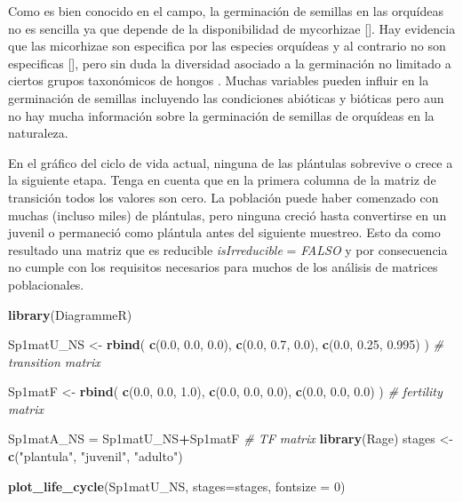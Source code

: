 \documentclass[
]{book}
\newenvironment{Shaded}{\begin{snugshade}}{\end{snugshade}}
\newcommand{\AttributeTok}[1]{\textcolor[rgb]{0.13,0.29,0.53}{#1}}
\newcommand{\CommentTok}[1]{\textcolor[rgb]{0.56,0.35,0.01}{\textit{#1}}}
\newcommand{\DecValTok}[1]{\textcolor[rgb]{0.00,0.00,0.81}{#1}}
\newcommand{\FloatTok}[1]{\textcolor[rgb]{0.00,0.00,0.81}{#1}}
\newcommand{\FunctionTok}[1]{\textcolor[rgb]{0.13,0.29,0.53}{\textbf{#1}}}
\newcommand{\NormalTok}[1]{#1}
\newcommand{\OtherTok}[1]{\textcolor[rgb]{0.56,0.35,0.01}{#1}}
\newcommand{\SpecialCharTok}[1]{\textcolor[rgb]{0.81,0.36,0.00}{\textbf{#1}}}
\newcommand{\StringTok}[1]{\textcolor[rgb]{0.31,0.60,0.02}{#1}}
\theoremstyle{definition}
\theoremstyle{definition}
\theoremstyle{definition}
\theoremstyle{definition}
\theoremstyle{remark}
\begin{document}
Como es bien conocido en el campo, la germinación de semillas en las orquídeas no es sencilla ya que depende de la disponibilidad de mycorhizae {[}{]}. Hay evidencia que las micorhizae son especifica por las especies orquídeas y al contrario no son especificas {[}{]}, pero sin duda la diversidad asociado a la germinación no limitado a ciertos grupos taxonómicos de hongos \citep{rasmussen2015germination}. Muchas variables pueden influir en la germinación de semillas incluyendo las condiciones abióticas y bióticas \citep{callaway2002epiphyte, rasmussen2015germination, gonzalez2024host} pero aun no hay mucha información sobre la germinación de semillas de orquídeas en la naturaleza.

En el gráfico del ciclo de vida actual, ninguna de las plántulas sobrevive o crece a la siguiente etapa. Tenga en cuenta que en la primera columna de la matriz de transición todos los valores son cero. La población puede haber comenzado con muchas (incluso miles) de plántulas, pero ninguna creció hasta convertirse en un juvenil o permaneció como plántula antes del siguiente muestreo. Esto da como resultado una matriz que es reducible \emph{isIrreducible} = \emph{FALSO} y por consecuencia no cumple con los requisitos necesarios para muchos de los análisis de matrices poblacionales.

\begin{Shaded}
\begin{Highlighting}[]
\FunctionTok{library}\NormalTok{(DiagrammeR)}

\NormalTok{Sp1matU\_NS }\OtherTok{\textless{}{-}} \FunctionTok{rbind}\NormalTok{(}
  \FunctionTok{c}\NormalTok{(}\FloatTok{0.0}\NormalTok{, }\FloatTok{0.0}\NormalTok{, }\FloatTok{0.0}\NormalTok{),}
  \FunctionTok{c}\NormalTok{(}\FloatTok{0.0}\NormalTok{, }\FloatTok{0.7}\NormalTok{, }\FloatTok{0.0}\NormalTok{),}
  \FunctionTok{c}\NormalTok{(}\FloatTok{0.0}\NormalTok{, }\FloatTok{0.25}\NormalTok{, }\FloatTok{0.995}\NormalTok{)}
\NormalTok{) }\CommentTok{\# transition matrix}

\NormalTok{Sp1matF }\OtherTok{\textless{}{-}} \FunctionTok{rbind}\NormalTok{(}
  \FunctionTok{c}\NormalTok{(}\FloatTok{0.0}\NormalTok{, }\FloatTok{0.0}\NormalTok{, }\FloatTok{1.0}\NormalTok{),}
  \FunctionTok{c}\NormalTok{(}\FloatTok{0.0}\NormalTok{, }\FloatTok{0.0}\NormalTok{, }\FloatTok{0.0}\NormalTok{),}
  \FunctionTok{c}\NormalTok{(}\FloatTok{0.0}\NormalTok{, }\FloatTok{0.0}\NormalTok{, }\FloatTok{0.0}\NormalTok{)}
\NormalTok{) }\CommentTok{\# fertility matrix}

\NormalTok{Sp1matA\_NS }\OtherTok{=}\NormalTok{ Sp1matU\_NS}\SpecialCharTok{+}\NormalTok{Sp1matF }\CommentTok{\# TF matrix}
\FunctionTok{library}\NormalTok{(Rage)}
\NormalTok{stages }\OtherTok{\textless{}{-}} \FunctionTok{c}\NormalTok{(}\StringTok{"plantula"}\NormalTok{, }\StringTok{"juvenil"}\NormalTok{, }\StringTok{"adulto"}\NormalTok{)}

\FunctionTok{plot\_life\_cycle}\NormalTok{(Sp1matU\_NS, }\AttributeTok{stages=}\NormalTok{stages, }\AttributeTok{fontsize =} \DecValTok{0}\NormalTok{)}
\end{Highlighting}
\end{Shaded}
\end{document}
